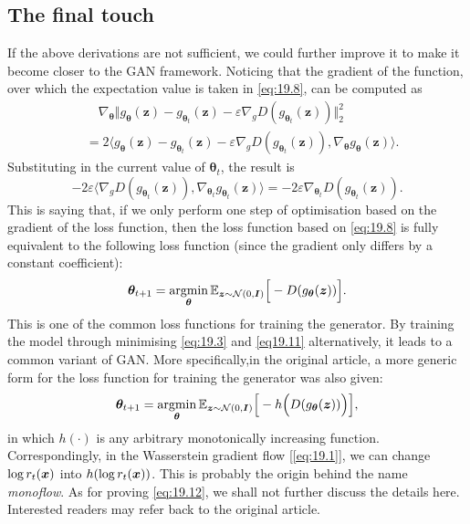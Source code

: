 \subsection{The final touch}

If the above derivations are not sufficient, we could further improve it to make it become closer to the GAN framework. Noticing that the gradient of the function, over which the expectation value is taken in \cref{eq:19.8}, can be computed as
\begin{align}
   &\quad\nabla_{\bm{\theta}} \Big\Vert g_{\bm{\theta}}(\bm{z})-g_{\bm{\theta}_t}(\bm{z})-\varepsilon \nabla_g D(g_{\bm{\theta}_t}(\bm{z})) \Big\Vert_2^2 \nonumber\\
   &=2\Big\langle g_{\bm{\theta}}(\bm{z})-g_{\bm{\theta}_t}(\bm{z})-\varepsilon \nabla_g D(g_{\bm{\theta}_t}(\bm{z})),\nabla_{\bm{\theta}}g_{\bm{\theta}}(\bm{z})\Big\rangle.\label{eq:19.9}
\end{align}
Substituting in the current value of $\bm{\theta}_t$, the result is
\begin{equation}
\label{eq:19.10}
-2\varepsilon\Big\langle \nabla_g D(g_{\bm{\theta}_t}(\bm{z})),\nabla_{\bm{\theta}_t}g_{\bm{\theta}_t}(\bm{z})  \Big\rangle = -2\varepsilon\nabla_{\bm{\theta}_t}D(g_{\bm{\theta}_t}(\bm{z})).
\end{equation}
This is saying that, if we only perform one step of optimisation based on the gradient of the loss function, then the loss function based on \cref{eq:19.8} is fully equivalent to the following loss function (since the gradient only differs by a constant coefficient):
\begin{equation}
    \label{eq:19.11}
    \bm{\theta}_{t+1}=\operatorname*{argmin}_{\bm{\theta}}\mathbb{E}_{\bm{z}\sim\mathcal{N}(0,\bm{I})}\Big[ -D(g_{\bm{\theta}}(\bm{z}))\Big].
\end{equation}
This is one of the common loss functions for training the generator. By training the model through minimising \cref{eq:19.3} and \cref{eq19.11} alternatively, it leads to a common variant of GAN. More specifically,in the original article, a more generic form for the loss function for training the generator was also given:
\begin{equation}
    \label{eq:19.12}
    \bm{\theta}_{t+1}=\operatorname*{argmin}_{\bm{\theta}}\mathbb{E}_{\bm{z}\sim\mathcal{N}(0,\bm{I})}\Big[ -h\Big(D(g_{\bm{\theta}}(\bm{z}))\Big)\Big],
\end{equation}
in which $h(\cdot)$ is any arbitrary monotonically increasing function. Correspondingly, in the Wasserstein gradient flow [\cref{eq:19.1}], we can change $\log r_t(\bm{x})$ into $h(\log r_t(\bm{x}))$. This is probably the origin behind the name \emph{monoflow}. As for proving \cref{eq:19.12}, we shall not further discuss the details here. Interested readers may refer back to the original article.

